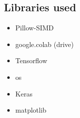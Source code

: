 \documentclass{article}
\begin{document}
\subsection*{Libraries used}
\begin{itemize}
\item Pillow-SIMD
\item google.colab (drive)
\item Tensorflow
\item os
\item Keras
\item matplotlib
\end{itemize}

\medskip
\small


\end{document}
